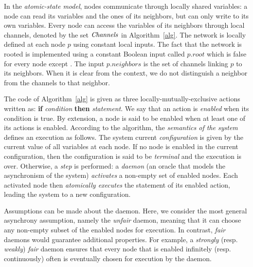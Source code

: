 In the \emph{atomic-state model}, nodes communicate through locally
shared variables: a node can read its variables and the ones of its
neighbors, but can only write to its own variables. Every node can
access the variables of its neighbors through local channels, denoted
by the set $\mathit{Channels}$ in Algorithm~\ref{alg}.
The network is locally defined at each node $p$ using constant local
inputs.  The fact that the network is rooted is implemented using a
constant Boolean input called $p.root$ which is false for every node
except \Root. The input $p.\mathit{neighbors}$ is the set of channels linking
$p$ to its neighbors.  When it is clear from the context, we do not
distinguish a neighbor from the channels to that neighbor.

The code of Algorithm~\ref{alg} is given as three
locally-mutually-exclusive actions written
as: \textbf{if} \emph{condition} \textbf{then} \emph{statement}. We
say that an action is \emph{enabled} when its condition is true. By
extension, a node is said to be enabled when at least one of its
actions is enabled.
According to the algorithm, the \emph{semantics of the system} defines an
execution as follows.  The system
current \emph{configuration} is given by the current value of all
variables at each node.  If no node is enabled in the current
configuration, then the configuration is said to be \emph{terminal}
and the execution is over.  Otherwise, a \emph{step} is performed:
a \emph{daemon} (an oracle that models the asynchronism of the
system) \emph{activates} a non-empty set of enabled nodes.  Each
activated node then \emph{atomically executes} the statement of its
enabled action, leading the system to a new configuration.

Assumptions can be made about the daemon. Here, we consider the most
general asynchrony assumption, namely the \emph{unfair} daemon,
meaning that it can choose any non-empty subset of the enabled nodes
for execution. In contrast, \emph{fair} daemons would guarantee
additional properties.  For example, a
\emph{strongly} (resp. \emph{weakly}) \emph{fair} daemon ensures that
every node that is enabled infinitely (resp. continuously) often is
eventually chosen for execution by the daemon.

